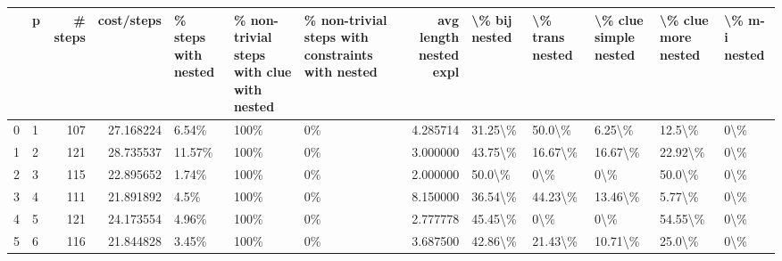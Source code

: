 \begin{tabular}{llrrlllrlllll}
\toprule
{} &  p &  \# steps &  cost/steps & \% steps with nested & \% non-trivial steps with clue with nested  & \% non-trivial steps with constraints with nested &  avg length nested expl & \textbackslash \% bij nested & \textbackslash \% trans nested & \textbackslash \% clue simple nested & \textbackslash \% clue more nested & \textbackslash \% m-i nested \\
\midrule
0 &  1 &      107 &   27.168224 &               6.54\% &                                       100\% &                                               0\% &                4.285714 &       31.25\textbackslash \% &          50.0\textbackslash \% &                6.25\textbackslash \% &              12.5\textbackslash \% &           0\textbackslash \% \\
1 &  2 &      121 &   28.735537 &              11.57\% &                                       100\% &                                               0\% &                3.000000 &       43.75\textbackslash \% &         16.67\textbackslash \% &               16.67\textbackslash \% &             22.92\textbackslash \% &           0\textbackslash \% \\
2 &  3 &      115 &   22.895652 &               1.74\% &                                       100\% &                                               0\% &                2.000000 &        50.0\textbackslash \% &             0\textbackslash \% &                   0\textbackslash \% &              50.0\textbackslash \% &           0\textbackslash \% \\
3 &  4 &      111 &   21.891892 &                4.5\% &                                       100\% &                                               0\% &                8.150000 &       36.54\textbackslash \% &         44.23\textbackslash \% &               13.46\textbackslash \% &              5.77\textbackslash \% &           0\textbackslash \% \\
4 &  5 &      121 &   24.173554 &               4.96\% &                                       100\% &                                               0\% &                2.777778 &       45.45\textbackslash \% &             0\textbackslash \% &                   0\textbackslash \% &             54.55\textbackslash \% &           0\textbackslash \% \\
5 &  6 &      116 &   21.844828 &               3.45\% &                                       100\% &                                               0\% &                3.687500 &       42.86\textbackslash \% &         21.43\textbackslash \% &               10.71\textbackslash \% &              25.0\textbackslash \% &           0\textbackslash \% \\

\end{tabular}
